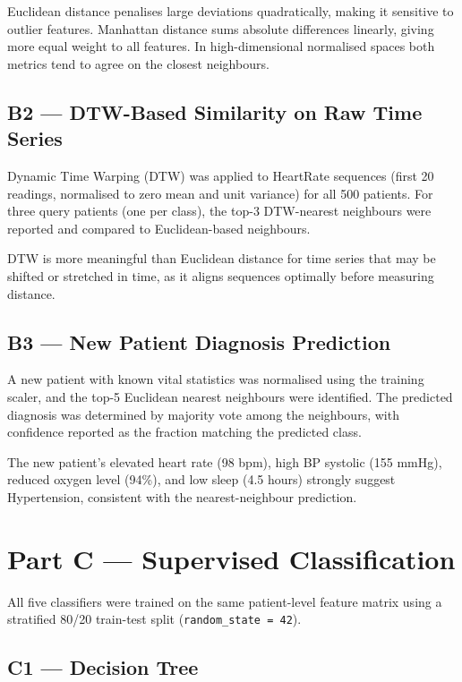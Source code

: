 \documentclass[12pt,a4paper]{article}
\begin{document}
Euclidean distance penalises large deviations quadratically, making it
sensitive to outlier features. Manhattan distance sums absolute differences
linearly, giving more equal weight to all features. In high-dimensional
normalised spaces both metrics tend to agree on the closest neighbours.

\subsection{B2 --- DTW-Based Similarity on Raw Time Series}

Dynamic Time Warping (DTW) was applied to HeartRate sequences (first 20
readings, normalised to zero mean and unit variance) for all 500 patients.
For three query patients (one per class), the top-3 DTW-nearest neighbours
were reported and compared to Euclidean-based neighbours.

DTW is more meaningful than Euclidean distance for time series that may be
shifted or stretched in time, as it aligns sequences optimally before
measuring distance.

\subsection{B3 --- New Patient Diagnosis Prediction}

A new patient with known vital statistics was normalised using the training
scaler, and the top-5 Euclidean nearest neighbours were identified. The
predicted diagnosis was determined by majority vote among the neighbours, with
confidence reported as the fraction matching the predicted class.

The new patient's elevated heart rate (98 bpm), high BP systolic (155 mmHg),
reduced oxygen level (94\%), and low sleep (4.5 hours) strongly suggest
Hypertension, consistent with the nearest-neighbour prediction.

\section{Part C --- Supervised Classification}

All five classifiers were trained on the same patient-level feature matrix
using a stratified 80/20 train-test split (\texttt{random\_state = 42}).

\subsection{C1 --- Decision Tree}
\end{document}
